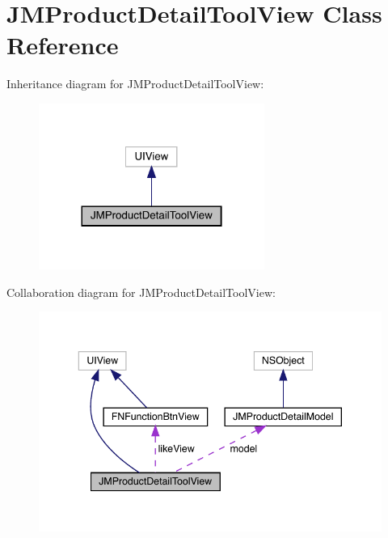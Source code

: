 \hypertarget{interface_j_m_product_detail_tool_view}{}\section{J\+M\+Product\+Detail\+Tool\+View Class Reference}
\label{interface_j_m_product_detail_tool_view}


Inheritance diagram for J\+M\+Product\+Detail\+Tool\+View\+:\nopagebreak
\begin{figure}[H]
\begin{center}
\leavevmode
\includegraphics[width=209pt]{interface_j_m_product_detail_tool_view__inherit__graph}
\end{center}
\end{figure}


Collaboration diagram for J\+M\+Product\+Detail\+Tool\+View\+:\nopagebreak
\begin{figure}[H]
\begin{center}
\leavevmode
\includegraphics[width=343pt]{interface_j_m_product_detail_tool_view__coll__graph}
\end{center}
\end{figure}
